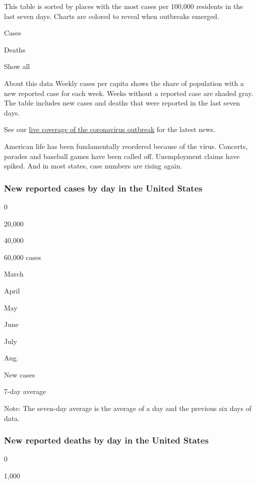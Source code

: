 This table is sorted by places with the most cases per 100,000 residents
in the last seven days. Charts are colored to reveal when outbreaks
emerged.

Cases

Deaths

Show all

About this data Weekly cases per capita shows the share of population
with a new reported case for each week. Weeks without a reported case
are shaded gray. The table includes new cases and deaths that were
reported in the last seven days.

See our
\href{https://www.nytimes.com/2020/08/08/world/coronavirus-covid-19.html}{live
coverage of the coronavirus outbreak} for the latest news.

American life has been fundamentally reordered because of the virus.
Concerts, parades and baseball games have been called off. Unemployment
claims have spiked. And in most states, case numbers are rising again.

\hypertarget{new-reported-cases-by-day-in-the-united-states}{%
\subsubsection{New reported cases by day in the United
States}\label{new-reported-cases-by-day-in-the-united-states}}

0

20,000

40,000

60,000 cases

March

April

May

June

July

Aug.

New cases

7-day average

Note: The seven-day average is the average of a day and the previous six
days of data.

\hypertarget{new-reported-deaths-by-day-in-the-united-states}{%
\subsubsection{New reported deaths by day in the United
States}\label{new-reported-deaths-by-day-in-the-united-states}}

0

1,000

